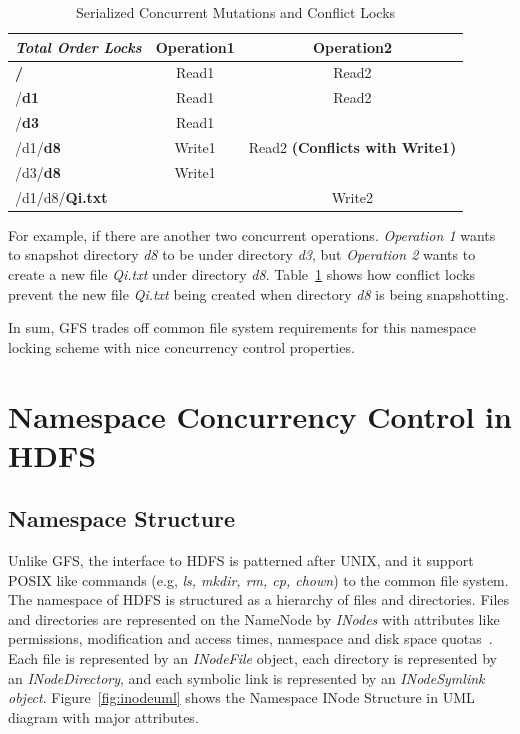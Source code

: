 \begin{table}[ht]
	\centering
	\begin{tabular}{|l|c|c|}
		\hline
		\textbf{\textit{Total Order Locks}}             & \textbf{Operation1} & \textbf{Operation2}                    \\ \hline
		\textbf{\color{red}/}             & Read1      & Read2                         \\ \hline
		/\textbf{\color{red}d1}           & Read1      & Read2                         \\ \hline
		/\textbf{\color{red}d3}           & Read1      & ~                             \\ \hline
		/d1/\textbf{\color{red}d8}        & Write1     & Read2 \textbf{(Conflicts with Write1)} \\ \hline
		/d3/\textbf{\color{red}d8}       & Write1     & ~                             \\ \hline
		/d1/d8/\textbf{\color{red}Qi.txt} & ~          & Write2                        \\ \hline
	\end{tabular}
	\caption{Serialized Concurrent Mutations and Conflict Locks}
	\label{table:gfsLock2}
\end{table}

\noindent For example, if there are another two concurrent operations. \textit{Operation 1} wants to snapshot directory \textit{d8} to be under directory \textit{d3}, but \textit{Operation 2} wants to create a new file \textit{Qi.txt} under directory \textit{d8}. Table~\ref{table:gfsLock2} shows how conflict locks prevent the new file \textit{Qi.txt} being created when directory \textit{d8} is being snapshotting.

\noindent In sum, GFS trades off common file system requirements for this namespace locking scheme with nice concurrency control properties.

\section{Namespace Concurrency Control in HDFS}

\subsection{Namespace Structure}

Unlike GFS, the interface to HDFS is patterned after UNIX, and it support POSIX like commands (e.g, \textit{ls, mkdir, rm, cp, chown}) to the common file system. The namespace of HDFS is structured as a hierarchy of files and directories. Files and directories are represented on the NameNode by \textit{INodes} with attributes like permissions, modification and access times, namespace and disk space quotas~\cite{borthakur2008hdfs}. Each file is represented by an \textit{INodeFile} object, each directory is represented by an \textit{INodeDirectory}, and each symbolic link is represented by an \textit{INodeSymlink object}. Figure~\ref{fig:inodeuml} shows the Namespace INode Structure in UML diagram with major attributes.

